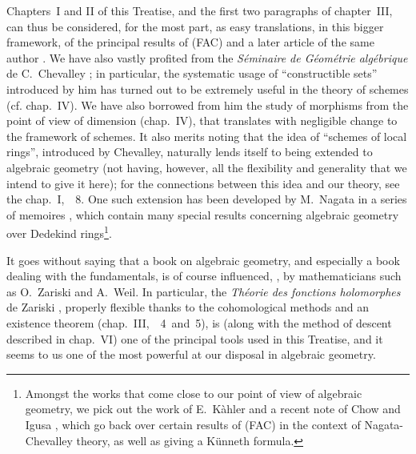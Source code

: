 Chapters~I and II of this Treatise, and the first two paragraphs of chapter~III,
can thus be considered, for the most part, as easy translations, in this bigger
framework, of the principal results of (FAC) and a later article of the same
author \cite{15}. We have also vastly profited from the \emph{S{\'e}minaire de
G{\'e}om{\'e}trie alg{\'e}brique} de C.~Chevalley \cite{1}; in particular, the
systematic usage of ``constructible sets'' introduced by him has turned out to
be extremely useful in the theory of schemes (cf. chap.~IV). We have also
borrowed from him the study of morphisms from the point of view of
dimension (chap.~IV), that translates with negligible change to the framework of
schemes. It also merits noting that the idea of ``schemes of local rings'',
introduced by Chevalley, naturally lends itself to being extended to algebraic
geometry (not having, however, all the flexibility and generality that we intend
to give it here); for the connections between this idea and our theory, see the
chap.~I,~\textsection~8. One such extension has been developed by M.~Nagata in
a series of memoires \cite{9}, which contain many special results concerning
algebraic geometry over Dedekind rings\footnote{Amongst the works that come
close to our point of view of algebraic geometry, we pick out the work of
E.~K{\`a}hler \cite{22} and a recent note of Chow and Igusa \cite{3}, which go
back over certain results of (FAC) in the context of Nagata-Chevalley theory, as
well as giving a K{\"u}nneth formula.}.

\asttri

It goes without saying that a book on algebraic geometry, and especially a book
dealing with the fundamentals, is of course influenced, \completelyunsure, by
mathematicians such as O.~Zariski and A.~Weil. In particular, the
\emph{Th{\'e}orie des fonctions holomorphes} de Zariski \cite{20}, properly
flexible thanks to the cohomological methods and an existence theorem
(chap.~III,~\textsection\textsection~4~and~5), is (along with the method of
descent described in chap.~VI) one of the principal tools used in this Treatise,
and it seems to us one of the most powerful at our disposal in algebraic
geometry.

